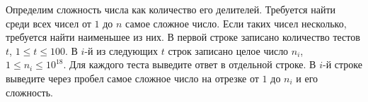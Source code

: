 Определим сложность числа как количество его делителей.
Требуется найти среди всех чисел от $1$ до $n$ самое сложное число.
Если таких чисел несколько, требуется найти наименьшее из них.
\InputFile
В первой строке записано количество тестов $t$, $1 \le t \le 100$.
В $i$-й из следующих $t$ строк записано целое число $n_i$,
$1 \le n_i \le 10^{18}$.
\OutputFile
Для каждого теста выведите ответ в отдельной строке.
В $i$-й строке выведите через пробел самое сложное
число на отрезке от $1$ до $n_i$ и его сложность.

